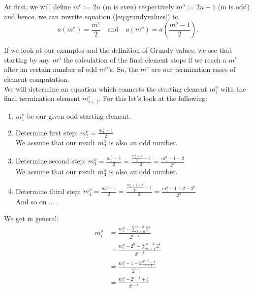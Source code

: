\documentclass[12pt]{../document-templates/papers/one-column-mydashie/mydashie}
\newtheorem*{theorem A}{Theorem A}
\newtheorem*{theorem B}{N\"olker's Theorem}
\theoremstyle{remark}
\theoremstyle{remark}
\begin{document}
At first, we will define $m^{e} := 2n$ (m is even) respectively $m^{o} := 2n + 1$ (m is odd) and hence, we can rewrite equation (\ref{eq:grundyvalues}) to
\begin{equation}
    a\left(m^{e}\right) = \frac{m^{e}}{2} \quad \mathrm{and} \quad a\left(m^{o}\right) = a\left(\frac{m^{o}-1}{2}\right).
\label{eq:grundyvalues_m}
\end{equation}

If we look at our examples and the definition of Grundy values, we see that starting by any $m^{o}$ the calculation of the final element stops if we reach a $m^{e}$ after an certain number of odd $m^{o}$'s. So, the $m^{e}$ are our termination cases of element computation.\\

We will determine an equation which connects the starting element $m_{1}^{o}$ with the final termination element $m_{i+1}^{e}$. For this let's look at the following:
\begin{enumerate}
    \item $m_{1}^{o}$ be our given odd starting element.
    \item Determine first step: $m^{o}_{2} = \frac{m_{1}^{o} - 1}{2}$\\
        We assume that our result $m^{o}_{2}$ is also an odd number.
    \item Determine second step: $m^{o}_{3} = \frac{m_{2}^{o} - 1}{2} = \frac{\frac{m_{1}^{o} - 1}{2} - 1}{2} = \frac{m_{1}^{o} - 1 - 2}{2^{2}}$\\
        We assume that our result $m^{o}_{3}$ is also an odd number.
    \item Determine third step: $m^{o}_{4} = \frac{m_{3}^{o} - 1}{2} = \frac{\frac{m_{1}^{o} - 1 - 2}{2^{2}} - 1}{2} = \frac{m_{1}^{o} - 1 - 2 - 2^{2}}{2^{3}}$\\
        And so on ... .
\end{enumerate}

We get in general:
\begin{equation}
    \begin{split}
    m_{i}^{o} &= \frac{m_{1}^{o} - \sum_{k=0}^{i-2}2^{k}}{2^{i-1}}\\
        &= \frac{m_{1}^{o} - 2^{0} - \sum_{k=1}^{i-2}2^{k}}{2^{i-1}}\\
        &= \frac{m_{1}^{o} - 1 - 2\frac{2^{i-2} - 1}{2 - 1}}{2^{i-1}}\\
        &= \frac{m_{1}^{o} - 2^{i-1} + 1}{2^{i-1}}
    \end{split}
\label{eq:moddeq}
\end{equation}
\end{document}

